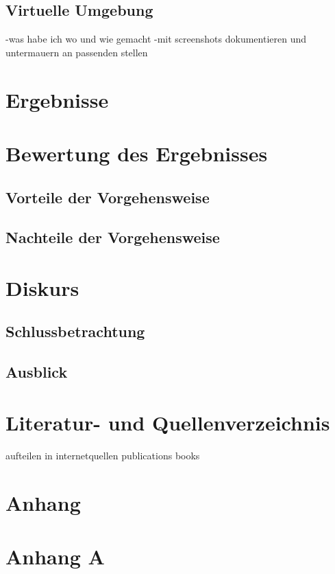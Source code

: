 \documentclass[12pt,oneside]{article}
\begin{document}
\subsection{Virtuelle Umgebung}
-was habe ich wo und wie gemacht
\newline
-mit screenshots dokumentieren und untermauern an passenden stellen


\section{Ergebnisse}
\newpage

\section{Bewertung des Ergebnisses}
\subsection{Vorteile der Vorgehensweise}
\subsection{Nachteile der Vorgehensweise}
\newpage

\section{Diskurs}
\subsection{Schlussbetrachtung}
\subsection{Ausblick}
\newpage 


\section{Literatur- und Quellenverzeichnis}

\printbibliography
{}
aufteilen in internetquellen
publications
books

\newpage
{}
\section{Anhang}
\appendix
\section{Anhang A} 





\clearpage

\end{document}
